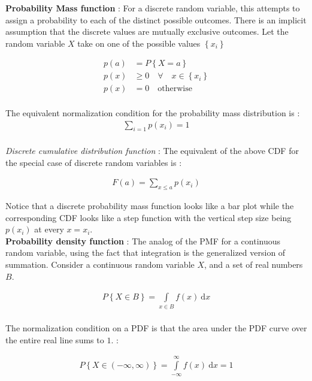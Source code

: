 \textbf{Probability Mass function} : For a discrete random variable, this attempts to assign a probability to each of the distinct possible outcomes. There is an implicit assumption that the discrete values are mutually exclusive outcomes. Let the random variable $ X $ take on one of the possible values $ \left\{x_i\right\} $

\begin{align}
	p(a) &= P \left\{X = a\right\} \\
	p(x) &\geq 0 \quad \forall \quad x \in \left\{x_i\right\} \\
	p(x) &= 0 \quad \text{otherwise}
\end{align} \\

The equivalent normalization condition for the probability mass distribution is : 
\begin{align}
	\sum\limits_{i = 1} p(x_i) = 1
\end{align} \\

\textit{Discrete cumulative distribution function} : The equivalent of the above CDF for the special case of discrete random variables is : 

\begin{align}
	F(a) = \sum\limits_{x \leq a} p(x_i)
\end{align}

Notice that a discrete probability mass function looks like a bar plot while the corresponding CDF looks like a step function with the vertical step size being $ p(x_i) $ at every $ x = x_i $. \\

\textbf{Probability density function} : The analog of the PMF for a continuous random variable, using the fact that integration is the generalized version of summation. Consider a continuous random variable $ X $, and a set of real numbers $ B $.

\begin{align}
	P \left\{X \in B \right\} = \int\limits_{x \in B} f(x) \ \mathrm{d}x
\end{align}\\

The normalization condition on a PDF is that the area under the PDF curve over the entire real line sums to $ 1 $. : 

\begin{align}
	P \left\{X \in \left(-\infty , \infty \right) \right\} = \int\limits_{-\infty}^{\infty} f(x) \ \mathrm{d}x = 1
\end{align} \\

